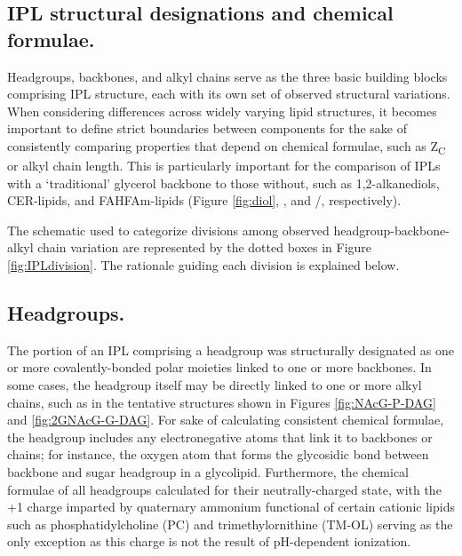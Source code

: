 \subsection{IPL structural designations and chemical formulae.} Headgroups, backbones, and alkyl chains serve as the three basic building blocks comprising IPL structure, each with its own set of observed structural variations. When considering differences across widely varying lipid structures, it becomes important to define strict boundaries between components for the sake of consistently comparing properties that depend on chemical formulae, such as Z\textsubscript{C} or alkyl chain length. This is particularly important for the comparison of IPLs with a `traditional' glycerol backbone to those without, such as 1,2-alkanediols, CER-lipids, and FAHFAm-lipids (Figure \ref{fig:diol}, , and /, respectively).

The schematic used to categorize divisions among observed headgroup-backbone-alkyl chain variation are represented by the dotted boxes in Figure \ref{fig:IPLdivision}. The rationale guiding each division is explained below.




\subsection{Headgroups.} The portion of an IPL comprising a headgroup was structurally designated as one or more covalently-bonded polar moieties linked to one or more backbones. In some cases, the headgroup itself may be directly linked to one or more alkyl chains, such as in the tentative structures shown in Figures \ref{fig:NAcG-P-DAG} and \ref{fig:2GNAcG-G-DAG}. For sake of calculating consistent chemical formulae, the headgroup includes any electronegative atoms that link it to backbones or chains; for instance, the oxygen atom that forms the glycosidic bond between backbone and sugar headgroup in a glycolipid. Furthermore, the chemical formulae of all headgroups calculated for their neutrally-charged state, with the +1 charge imparted by quaternary ammonium functional of certain cationic lipids such as phosphatidylcholine (PC) and trimethylornithine (TM-OL) serving as the only exception as this charge is not the result of pH-dependent ionization.

